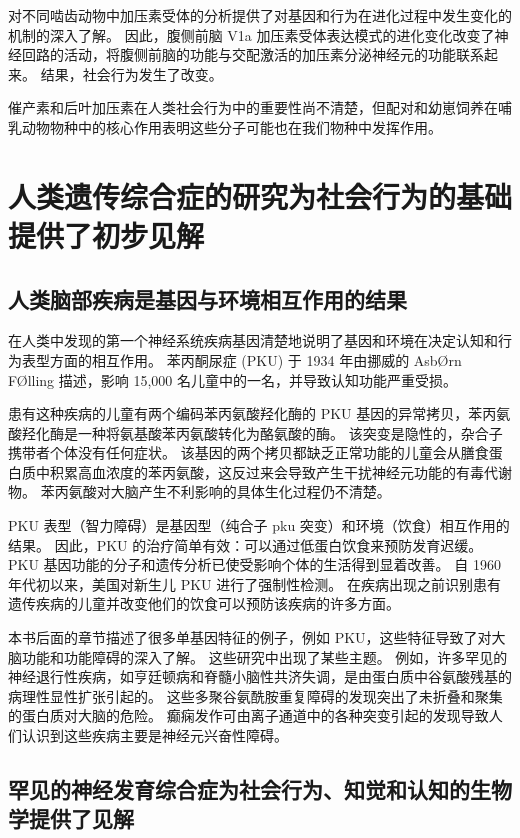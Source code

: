 对不同啮齿动物中加压素受体的分析提供了对基因和行为在进化过程中发生变化的机制的深入了解。 
因此，腹侧前脑 V1a 加压素受体表达模式的进化变化改变了神经回路的活动，将腹侧前脑的功能与交配激活的加压素分泌神经元的功能联系起来。 
结果，社会行为发生了改变。


催产素和后叶加压素在人类社会行为中的重要性尚不清楚，但配对和幼崽饲养在哺乳动物物种中的核心作用表明这些分子可能也在我们物种中发挥作用。


\section{人类遗传综合症的研究为社会行为的基础提供了初步见解}
\subsection{人类脑部疾病是基因与环境相互作用的结果}
在人类中发现的第一个神经系统疾病基因清楚地说明了基因和环境在决定认知和行为表型方面的相互作用。 
苯丙酮尿症 (PKU) 于 1934 年由挪威的 AsbØrn FØlling 描述，影响 15,000 名儿童中的一名，并导致认知功能严重受损。


患有这种疾病的儿童有两个编码苯丙氨酸羟化酶的 PKU 基因的异常拷贝，苯丙氨酸羟化酶是一种将氨基酸苯丙氨酸转化为酪氨酸的酶。 
该突变是隐性的，杂合子携带者个体没有任何症状。 
该基因的两个拷贝都缺乏正常功能的儿童会从膳食蛋白质中积累高血浓度的苯丙氨酸，这反过来会导致产生干扰神经元功能的有毒代谢物。 
苯丙氨酸对大脑产生不利影响的具体生化过程仍不清楚。


PKU 表型（智力障碍）是基因型（纯合子 pku 突变）和环境（饮食）相互作用的结果。 
因此，PKU 的治疗简单有效：可以通过低蛋白饮食来预防发育迟缓。 
PKU 基因功能的分子和遗传分析已使受影响个体的生活得到显着改善。 
自 1960 年代初以来，美国对新生儿 PKU 进行了强制性检测。 
在疾病出现之前识别患有遗传疾病的儿童并改变他们的饮食可以预防该疾病的许多方面。


本书后面的章节描述了很多单基因特征的例子，例如 PKU，这些特征导致了对大脑功能和功能障碍的深入了解。 
这些研究中出现了某些主题。 
例如，许多罕见的神经退行性疾病，如亨廷顿病和脊髓小脑性共济失调，是由蛋白质中谷氨酸残基的病理性显性扩张引起的。 
这些多聚谷氨酰胺重复障碍的发现突出了未折叠和聚集的蛋白质对大脑的危险。 
癫痫发作可由离子通道中的各种突变引起的发现导致人们认识到这些疾病主要是神经元兴奋性障碍。


\subsection{罕见的神经发育综合症为社会行为、知觉和认知的生物学提供了见解}

